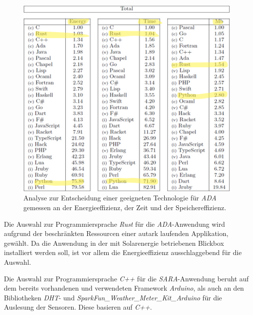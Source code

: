 \documentclass[
]{article}
\begin{document}
\begin{figure}[H]
    \centering
    \includegraphics[width=1\textwidth]{./resources/AuswahlRust.png}
    \caption{Analyse zur Entscheidung einer geeigneten Technologie für \textit{ADA} gemessen an der Energieeffizienz, der Zeit und der Speichereffizienz.}
    \label{fig:deine_label}
\end{figure}

Die Auswahl zur Programmiersprache \textit{Rust} für die \textit{ADA}-Anwendung wird aufgrund der beschränkten Ressourcen einer autark laufenden Applikation, gewählt.
Da die Anwendung in der mit Solarenergie betriebenen Blickbox installiert werden soll, ist vor allem die Energieeffizienz ausschlaggebend für die Auswahl.

Die Auswahl zur Programmiersprache \textit{C++} für die \textit{SARA}-Anwendung beruht auf dem bereits vorhandenen und verwendeten Framework \textit{Arduino}, als auch an den Bibliotheken \textit{DHT}- und \textit{SparkFun\_Weather\_Meter\_Kit\_Arduino} für die Auslesung der Sensoren. Diese basieren auf \textit{C++}.
\end{document}
